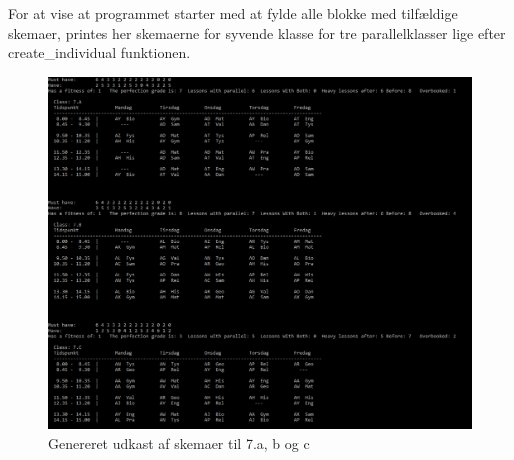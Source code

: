 For at vise at programmet starter med at fylde alle blokke med tilfældige skemaer, printes her skemaerne for syvende klasse for tre parallelklasser lige efter create\_individual funktionen.
\begin{figure}[h]
  \centering
  \includegraphics[width=\textwidth]{partials/graphics/startsskema.png}
  \caption{Genereret udkast af skemaer til 7.a, b og c }
  \label{fig:startsskema}
\end{figure}
